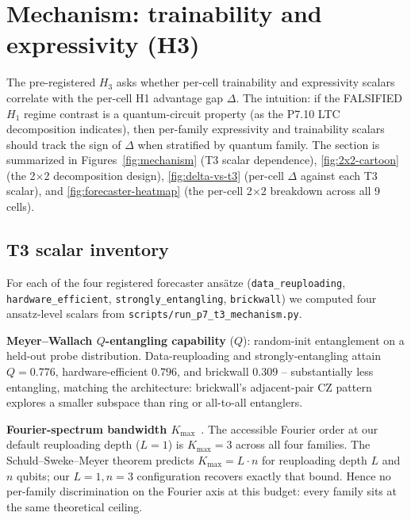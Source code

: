 
\section{Mechanism: trainability and expressivity (H3)}
\label{sec:mechanism}

The pre-registered $H_3$ asks whether per-cell trainability and
expressivity scalars correlate with the per-cell H1 advantage gap
$\Delta$. The intuition: if the FALSIFIED $H_1$ regime contrast is a
quantum-circuit property (as the P7.10 LTC decomposition indicates),
then per-family expressivity and trainability scalars should track the
sign of $\Delta$ when stratified by quantum family. The section is
summarized in Figures~\ref{fig:mechanism} (T3 scalar dependence),
\ref{fig:2x2-cartoon} (the 2$\times$2 decomposition design),
\ref{fig:delta-vs-t3} (per-cell $\Delta$ against each T3 scalar), and
\ref{fig:forecaster-heatmap} (the per-cell 2$\times$2 breakdown across
all 9 cells).

\subsection{T3 scalar inventory}
\label{sec:mechanism-scalars}

For each of the four registered forecaster ansätze
(\texttt{data\_reuploading}, \texttt{hardware\_efficient},
\texttt{strongly\_entangling}, \texttt{brickwall}) we computed four
ansatz-level scalars from
\texttt{scripts/run\_p7\_t3\_mechanism.py}.

\textbf{Meyer--Wallach $Q$-entangling capability} ($Q$): random-init
entanglement on a held-out probe distribution. Data-reuploading and
strongly-entangling attain $Q = 0.776$, hardware-efficient $0.796$,
and brickwall $0.309$ -- substantially less entangling, matching the
architecture: brickwall's adjacent-pair CZ pattern explores a smaller
subspace than ring or all-to-all entanglers.

\textbf{Fourier-spectrum bandwidth $K_{\max}$}~\cite{schuld2021effect}.
The accessible Fourier order at our default reuploading depth ($L=1$)
is $K_{\max}=3$ across all four families. The Schuld--Sweke--Meyer
theorem predicts $K_{\max} = L \cdot n$ for reuploading depth $L$ and
$n$ qubits; our $L=1, n=3$ configuration recovers exactly that bound.
Hence no per-family discrimination on the Fourier axis at this budget:
every family sits at the same theoretical ceiling.

